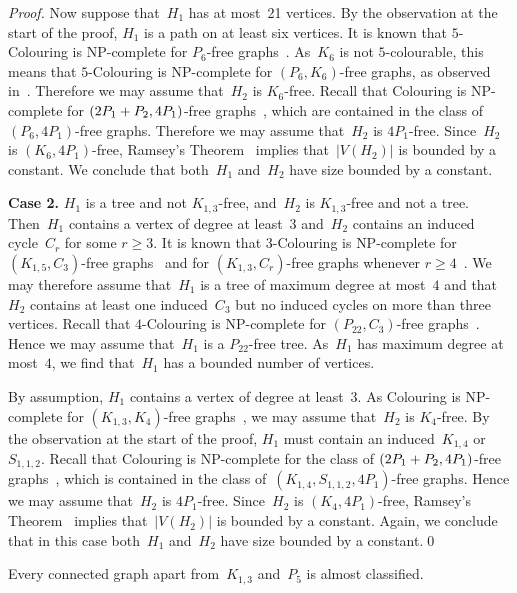 \documentclass{llncs}
\newcommand{\NP}{{\sf NP}}
\begin{document}
\begin{proof}
Now suppose that~$H_1$ has at most~21 vertices.
By the observation at the start of the proof, $H_1$ is a path on at least six vertices.
It is known that {\sc $5$-Colouring} is \NP-complete for $P_6$-free graphs~\cite{Hu16}.
As~$K_6$ is not $5$-colourable, this means that {\sc $5$-Colouring} is \NP-complete for $(P_6,K_6)$-free graphs, as observed in~\cite{GJPS}.
Therefore we may assume that~$H_2$ is $K_6$-free.
Recall that {\sc Colouring} is \NP-complete for $(2P_1+\nobreak P_2,4P_1)$-free graphs~\cite{KKTW01}, which are contained in the class of $(P_6,4P_1)$-free graphs.
Therefore we may assume that~$H_2$ is $4P_1$-free.
Since~$H_2$ is $(K_6,4P_1)$-free, Ramsey's Theorem~\cite{Ra30} implies that~$|V(H_2)|$ is bounded by a constant.
We conclude that both~$H_1$ and~$H_2$ have size bounded by a constant.

\medskip
\noindent
{\bf Case 2.} $H_1$ is a tree and not $K_{1,3}$-free, and~$H_2$ is $K_{1,3}$-free and not a tree.\\
Then~$H_1$ contains a vertex of degree at least~$3$ and~$H_2$ contains an induced cycle~$C_r$ for some $r\geq 3$.
It is known that {\sc $3$-Colouring} is \NP-complete for $(K_{1,5},C_3)$-free graphs~\cite{MF96} and for $(K_{1,3},C_r)$-free graphs whenever $r \geq 4$~\cite{KKTW01}.
We may therefore assume that~$H_1$ is a tree of maximum degree at most~$4$ and that~$H_2$ contains at least one induced~$C_3$ but no induced cycles on more than three vertices.
Recall that {\sc $4$-Colouring} is \NP-complete for $(P_{22},C_3)$-free graphs~\cite{HJP14}.
Hence we may assume that~$H_1$ is a $P_{22}$-free tree.
As~$H_1$ has maximum degree at most~$4$, we find that~$H_1$ has a bounded number of vertices.

By assumption, $H_1$ contains a vertex of degree at least~$3$.
As {\sc Colouring} is \NP-complete for $(K_{1,3},K_4)$-free graphs~\cite{KKTW01}, we may assume that~$H_2$ is $K_4$-free.
By the observation at the start of the proof, $H_1$ must contain an induced~$K_{1,4}$ or~$S_{1,1,2}$.
Recall that {\sc Colouring} is \NP-complete for the class of $(2P_1+\nobreak P_2,4P_1)$-free graphs~\cite{KKTW01}, which is contained in the class of~$(K_{1,4},S_{1,1,2},4P_1)$-free graphs.
Hence we may assume that~$H_2$ is $4P_1$-free.
Since~$H_2$ is $(K_4,4P_1)$-free, Ramsey's Theorem~\cite{Ra30} implies that~$|V(H_2)|$ is bounded by a constant.
Again, we conclude that in this case both~$H_1$ and~$H_2$ have size bounded by a constant.\qed
\end{proof}

\begin{corollary}\label{t-almost}
Every connected graph apart from~$K_{1,3}$ and~$P_5$ is almost classified.
\end{corollary}
\end{document}
